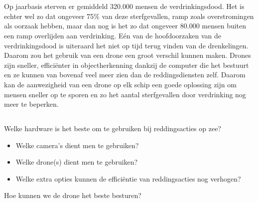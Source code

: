 
\chapter{}
\label{ch:inleiding}

\section{}
\label{sec:probleemstelling}

Op jaarbasis sterven er gemiddeld 320.000 mensen de verdrinkingsdood. Het is echter wel zo dat ongeveer 75\% van deze sterfgevallen, ramp zoals overstromingen als oorzaak hebben, maar dan nog is het zo dat ongeveer 80.000 mensen buiten een ramp overlijden aan verdrinking. \autocite{WorldHealthOrganisation} Eén van de hoofdoorzaken van de verdrinkingsdood is uiteraard het niet op tijd terug vinden van de drenkelingen. Daarom zou het gebruik van een drone een groot verschil kunnen maken. Drones zijn sneller, efficiënter in objectherkenning dankzij de computer die het bestuurt en ze kunnen van bovenaf veel meer zien dan de reddingsdiensten zelf. Daarom kan de aanwezigheid van een drone op elk schip een goede oplossing zijn om mensen sneller op te sporen en zo het aantal sterfgevallen door verdrinking nog meer te beperken.

\section{}
\label{sec:onderzoeksvraag}

Welke hardware is het beste om te gebruiken bij reddingsacties op zee?

\begin{itemize}
	\item Welke camera's dient men te gebruiken?
	\item Welke drone(s) dient men te gebruiken?
	\item Welke extra opties kunnen de efficiëntie van reddingsacties nog verhogen?
\end{itemize}

Hoe kunnen we de drone het beste besturen?

